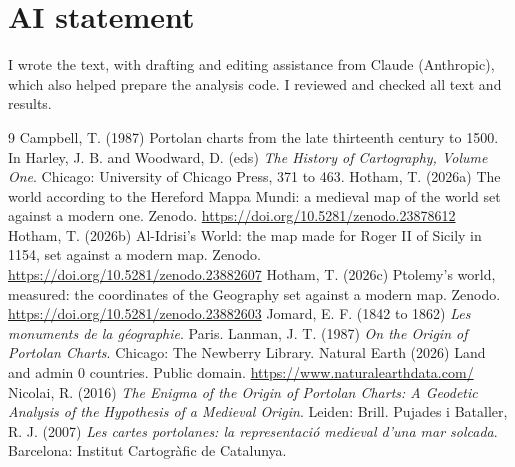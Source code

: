 \documentclass[11pt,a4paper]{article}
\begin{document}
\section*{AI statement}
I wrote the text, with drafting and editing assistance from Claude (Anthropic), which also helped prepare the analysis code. I reviewed and checked all text and results.

\begin{thebibliography}{9}
 Campbell, T. (1987) Portolan charts from the late thirteenth century to 1500. In Harley, J. B. and Woodward, D. (eds) \textit{The History of Cartography, Volume One}. Chicago: University of Chicago Press, 371 to 463.
 Hotham, T. (2026a) The world according to the Hereford Mappa Mundi: a medieval map of the world set against a modern one. Zenodo. \url{https://doi.org/10.5281/zenodo.23878612}
 Hotham, T. (2026b) Al-Idrisi's World: the map made for Roger II of Sicily in 1154, set against a modern map. Zenodo. \url{https://doi.org/10.5281/zenodo.23882607}
 Hotham, T. (2026c) Ptolemy's world, measured: the coordinates of the Geography set against a modern map. Zenodo. \url{https://doi.org/10.5281/zenodo.23882603}
 Jomard, E. F. (1842 to 1862) \textit{Les monuments de la g\'eographie}. Paris.
 Lanman, J. T. (1987) \textit{On the Origin of Portolan Charts}. Chicago: The Newberry Library.
 Natural Earth (2026) Land and admin 0 countries. Public domain. \url{https://www.naturalearthdata.com/}
 Nicolai, R. (2016) \textit{The Enigma of the Origin of Portolan Charts: A Geodetic Analysis of the Hypothesis of a Medieval Origin}. Leiden: Brill.
 Pujades i Bataller, R. J. (2007) \textit{Les cartes portolanes: la representaci\'o medieval d'una mar solcada}. Barcelona: Institut Cartogr\`afic de Catalunya.
\end{thebibliography}
\end{document}

